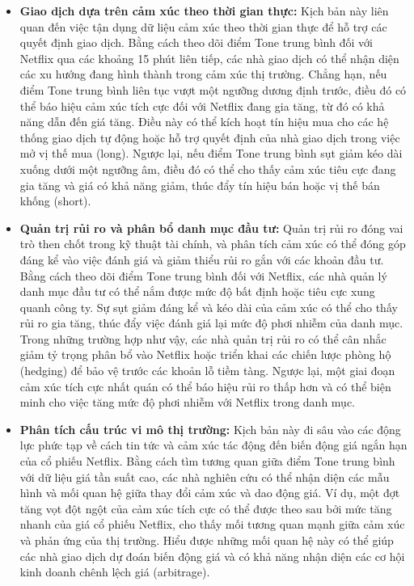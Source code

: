 \begin{itemize}
\item
  \textbf{Giao dịch dựa trên cảm xúc theo thời gian thực:} Kịch bản này liên quan đến việc tận dụng dữ liệu cảm xúc theo thời gian thực để hỗ trợ các quyết định giao dịch. Bằng cách theo dõi điểm Tone trung bình đối với Netflix qua các khoảng 15 phút liên tiếp, các nhà giao dịch có thể nhận diện các xu hướng đang hình thành trong cảm xúc thị trường. Chẳng hạn, nếu điểm Tone trung bình liên tục vượt một ngưỡng dương định trước, điều đó có thể báo hiệu cảm xúc tích cực đối với Netflix đang gia tăng, từ đó có khả năng dẫn đến giá tăng. Điều này có thể kích hoạt tín hiệu mua cho các hệ thống giao dịch tự động hoặc hỗ trợ quyết định của nhà giao dịch trong việc mở vị thế mua (long). Ngược lại, nếu điểm Tone trung bình sụt giảm kéo dài xuống dưới một ngưỡng âm, điều đó có thể cho thấy cảm xúc tiêu cực đang gia tăng và giá có khả năng giảm, thúc đẩy tín hiệu bán hoặc vị thế bán khống (short).
\item
  \textbf{Quản trị rủi ro và phân bổ danh mục đầu tư:} Quản trị rủi ro đóng vai trò then chốt trong kỹ thuật tài chính, và phân tích cảm xúc có thể đóng góp đáng kể vào việc đánh giá và giảm thiểu rủi ro gắn với các khoản đầu tư. Bằng cách theo dõi điểm Tone trung bình đối với Netflix, các nhà quản lý danh mục đầu tư có thể nắm được mức độ bất định hoặc tiêu cực xung quanh công ty. Sự sụt giảm đáng kể và kéo dài của cảm xúc có thể cho thấy rủi ro gia tăng, thúc đẩy việc đánh giá lại mức độ phơi nhiễm của danh mục. Trong những trường hợp như vậy, các nhà quản trị rủi ro có thể cân nhắc giảm tỷ trọng phân bổ vào Netflix hoặc triển khai các chiến lược phòng hộ (hedging) để bảo vệ trước các khoản lỗ tiềm tàng. Ngược lại, một giai đoạn cảm xúc tích cực nhất quán có thể báo hiệu rủi ro thấp hơn và có thể biện minh cho việc tăng mức độ phơi nhiễm với Netflix trong danh mục.
\item
  \textbf{Phân tích cấu trúc vi mô thị trường:} Kịch bản này đi sâu vào các động lực phức tạp về cách tin tức và cảm xúc tác động đến biến động giá ngắn hạn của cổ phiếu Netflix. Bằng cách tìm tương quan giữa điểm Tone trung bình với dữ liệu giá tần suất cao, các nhà nghiên cứu có thể nhận diện các mẫu hình và mối quan hệ giữa thay đổi cảm xúc và dao động giá. Ví dụ, một đợt tăng vọt đột ngột của cảm xúc tích cực có thể được theo sau bởi mức tăng nhanh của giá cổ phiếu Netflix, cho thấy mối tương quan mạnh giữa cảm xúc và phản ứng của thị trường. Hiểu được những mối quan hệ này có thể giúp các nhà giao dịch dự đoán biến động giá và có khả năng nhận diện các cơ hội kinh doanh chênh lệch giá (arbitrage).

\end{itemize}
